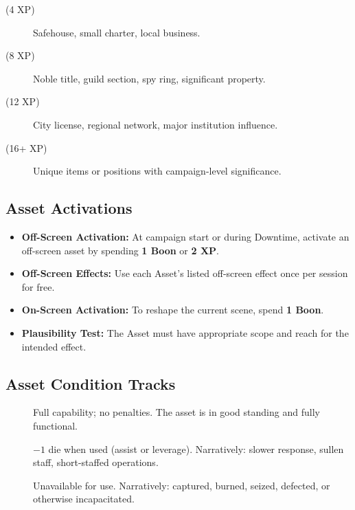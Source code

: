\begin{description}
\item[ (4 XP)] Safehouse, small charter, local business. 
\item[ (8 XP)] Noble title, guild section, spy ring, significant property. 
\item[ (12 XP)] City license, regional network, major institution influence. 
\item[ (16+ XP)] Unique items or positions with campaign-level significance. 
\end{description}

\subsection{Asset Activations}
\label{subsec:asset-activations}

\begin{itemize}
    \item \textbf{Off-Screen Activation:} At campaign start or during Downtime, activate an off-screen asset by spending \textbf{1 Boon} or \textbf{2 XP}. 
    \item \textbf{Off-Screen Effects:} Use each Asset's listed off-screen effect once per session for free. 
    \item \textbf{On-Screen Activation:} To reshape the current scene, spend \textbf{1 Boon}. 
    \item \textbf{Plausibility Test:} The Asset must have appropriate scope and reach for the intended effect. 
\end{itemize}

\subsection{Asset Condition Tracks}
\label{subsec:asset-conditions}

\begin{description}
\item[] Full capability; no penalties. The asset is in good standing and fully functional. 
\item[] $-1$ die when used (assist or leverage). Narratively: slower response, sullen staff, short-staffed operations. 
\item[] Unavailable for use. Narratively: captured, burned, seized, defected, or otherwise incapacitated. 
\end{description}

